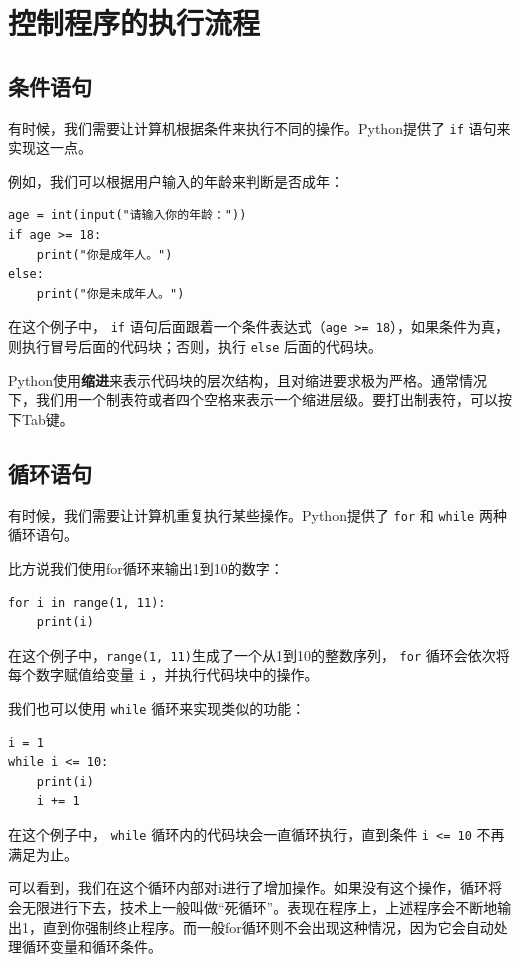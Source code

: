 \section{控制程序的执行流程}

\subsection{条件语句}

有时候，我们需要让计算机根据条件来执行不同的操作。Python提供了 \texttt{if} 语句来实现这一点。

例如，我们可以根据用户输入的年龄来判断是否成年：
\begin{verbatim}
age = int(input("请输入你的年龄："))
if age >= 18:
    print("你是成年人。")
else:
    print("你是未成年人。")
\end{verbatim}
在这个例子中， \texttt{if} 语句后面跟着一个条件表达式（\texttt{age >=
18}），如果条件为真，则执行冒号后面的代码块；否则，执行 \texttt{else} 后面的代码块。

Python使用\textbf{缩进}来表示代码块的层次结构，且对缩进要求极为严格。通常情况下，我们用一个制表符或者四个空格来表示一个缩进层级。要打出制表符，可以按下Tab键。

\subsection{循环语句}

有时候，我们需要让计算机重复执行某些操作。Python提供了 \texttt{for} 和 \texttt{while} 两种循环语句。

比方说我们使用for循环来输出1到10的数字：
\begin{verbatim}
for i in range(1, 11):
    print(i)
\end{verbatim}
在这个例子中，\texttt{range(1,
11)}生成了一个从1到10的整数序列， \texttt{for} 循环会依次将每个数字赋值给变量 \texttt{i} ，并执行代码块中的操作。

我们也可以使用 \texttt{while} 循环来实现类似的功能：
\begin{verbatim}
i = 1
while i <= 10:
    print(i)
    i += 1
\end{verbatim}
在这个例子中， \texttt{while} 循环内的代码块会一直循环执行，直到条件 \texttt{i <= 10} 不再满足为止。

可以看到，我们在这个循环内部对i进行了增加操作。如果没有这个操作，循环将会无限进行下去，技术上一般叫做“死循环”。表现在程序上，上述程序会不断地输出1，直到你强制终止程序。而一般for循环则不会出现这种情况，因为它会自动处理循环变量和循环条件。

